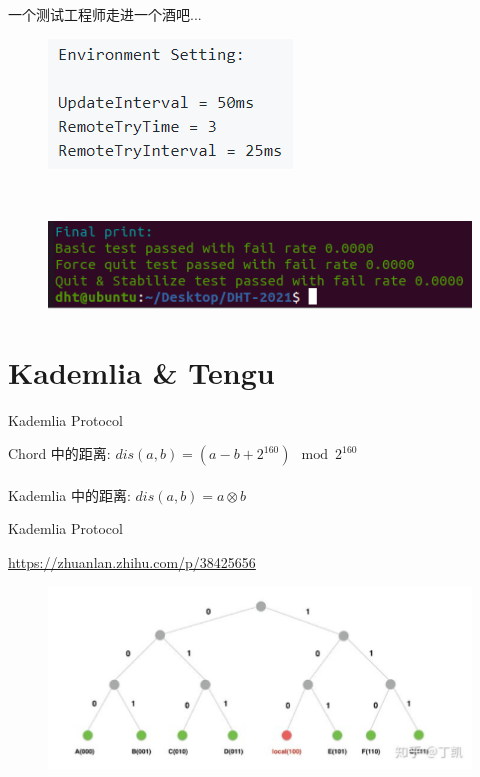 \documentclass[10pt]{beamer}
\begin{document}
\begin{frame}{一个测试工程师走进一个酒吧...}

\begin{figure}
\centering
\includegraphics[scale=0.8]{figure/env.png}
\end{figure}

\\[20pt]

\begin{figure}
\centering
\includegraphics[scale=0.6]{figure/performance.png}
\end{figure}

\end{frame}

\section{Kademlia \& Tengu}

\begin{frame}{Kademlia Protocol}

\alert{Chord 中的距离:} $dis(a,b) = (a - b + 2^{160}) \mod 2^{160}$ \\

\\[20pt]

\alert{Kademlia 中的距离:} $dis(a,b) = a \otimes b$ \\

\end{frame}

\begin{frame}{Kademlia Protocol}

\url{https://zhuanlan.zhihu.com/p/38425656}

\begin{figure}
\centering
\includegraphics[scale=0.6]{figure/kad.png}
\end{figure}

\end{frame}
\end{document}
